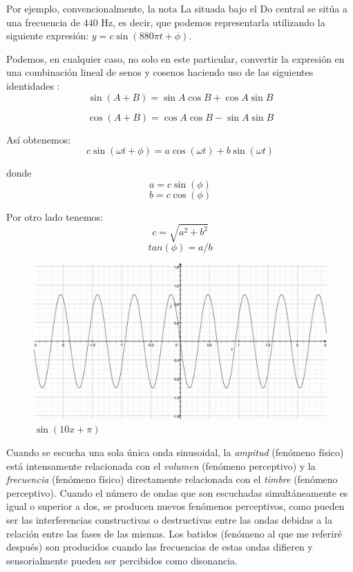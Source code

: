 \documentclass[11pt,a4paper]{article}
\begin{document}
		Por ejemplo, convencionalmente, la nota La situada bajo el Do central se sitúa a una frecuencia de $440$ Hz, es decir, que podemos representarla utilizando la siguiente expresión: $ y = c \sin( 880 \pi t + \phi) $. 
		
		Podemos, en cualquier caso, no solo en este particular, convertir la expresión en una combinación lineal de senos y cosenos haciendo uso de las siguientes identidades :
		$$
			\sin ( A + B ) = \sin A \cos B + \cos A \sin B 
		$$

		$$
			\cos ( A + B ) = \cos A \cos B - \sin A \sin B
		$$
		
		Así obtenemos:
		$$
			c \sin (\omega t + \phi) = a \cos (\omega t) + b \sin (\omega t)
		$$
		
		donde		
		$$
			a = c \sin(\phi)     $$  $$        b = c \cos(\phi)
		$$
		
		Por otro lado tenemos:
		$$
			c = \sqrt{a^2 + b^2}  $$  $$  tan (\phi) = a / b 
		$$
		 
		\begin{figure}[h]  %
			\centering	
			\includegraphics[scale= 0.3]{Sin10xmaspi.jpg}
			\caption{$ \sin(10x + \pi) $} 
		\end{figure}
	
		 Cuando se escucha una sola única onda sinusoidal, la \emph{ampitud} (fenómeno físico) está intensamente relacionada con el \emph{volumen} (fenómeno perceptivo) y la \emph{frecuencia} (fenómeno físico) directamente relacionada con el \emph{timbre} (fenómeno perceptivo).  Cuando el número de ondas que son escuchadas simultáneamente es igual o superior a dos, se producen nuevos fenómenos perceptivos, como pueden ser las interferencias constructivas o destructivas entre las ondas debidas a la relación entre las fases de las mismas. Los batidos (fenómeno al que me referiré después) son producidos cuando las frecuencias de estas ondas difieren y sensorialmente pueden ser percibidos como disonancia.
		 
\end{document}
